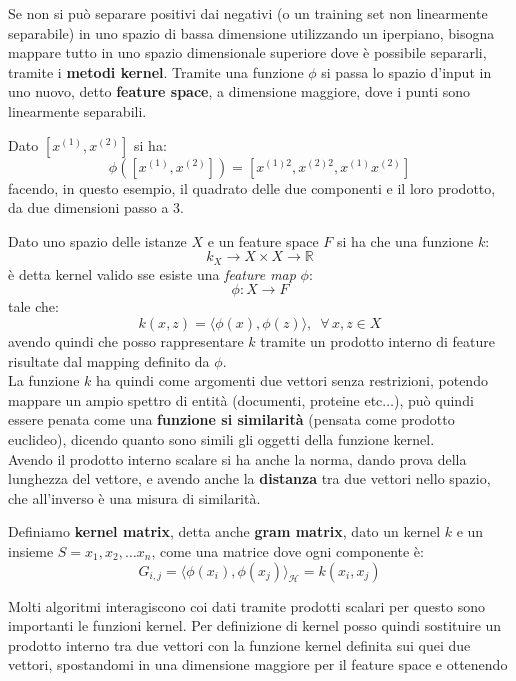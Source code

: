 Se non si può separare positivi dai negativi (o un training set non linearmente
separabile) in uno spazio di bassa dimensione
utilizzando un iperpiano, bisogna mappare tutto in uno spazio dimensionale
superiore dove è possibile separarli, tramite i \textbf{metodi kernel}. Tramite
una funzione $\phi$ si passa lo spazio d'input in uno nuovo, detto
\textbf{feature space}, a dimensione maggiore, dove i punti sono linearmente
separabili.  
\begin{esempio}
  Dato $[x^{(1)}, x^{(2)}]$ si ha:
  \[\phi([x^{(1)}, x^{(2)}])=[x^{(1)2}, x^{(2)2}, x^{(1)}x^{(2)}]\]
  facendo, in questo esempio, il quadrato delle due componenti e il loro
  prodotto, da due dimensioni passo a 3.
\end{esempio}
\begin{definizione}
  Dato uno spazio delle istanze $X$ e un feature space $F$ si ha che una
  funzione $k$:
  \[k_X\to X\times X\to\mathbb{R}\]
  è detta kernel valido sse esiste una \textit{feature map} $\phi$:
  \[\phi:X\to F\]
  tale che:
  \[k(x, z)=\langle\phi(x),\phi(z)\rangle,\,\,\,\forall\, x, z\in X\]
  avendo quindi che posso rappresentare $k$ tramite un prodotto interno di
  feature risultate dal mapping definito da $\phi$.\\
  La funzione $k$ ha quindi come argomenti due vettori senza restrizioni,
  potendo mappare un ampio spettro di entità (documenti, proteine etc$\ldots$),
  può quindi essere penata come una \textbf{funzione si similarità} (pensata
  come prodotto euclideo), dicendo
  quanto sono simili gli oggetti della funzione kernel.\\
  Avendo il prodotto interno scalare si ha anche la norma, dando prova della
  lunghezza del vettore, e avendo anche la \textbf{distanza} tra due vettori
  nello spazio, che all'inverso è una misura di similarità.
\end{definizione}
\begin{definizione}
  Definiamo \textbf{kernel matrix}, detta anche \textbf{gram matrix}, dato un
  kernel $k$ e un insieme 
  $S=x_1, x_2,\ldots x_n$, come una matrice dove ogni componente è:
  \[G_{i, j}=\langle\phi(x_i),\phi(x_j)\rangle_{\mathcal{H}}=k(x_i, x_j)\]
\end{definizione}
Molti algoritmi interagiscono coi dati tramite prodotti scalari per questo sono
importanti le funzioni kernel. Per definizione di kernel posso quindi sostituire
un prodotto interno tra due vettori con la funzione kernel definita sui quei due
vettori, spostandomi in una dimensione maggiore per il feature space e ottenendo
